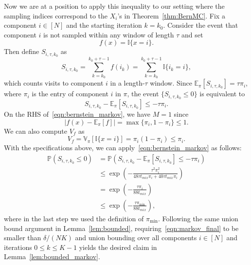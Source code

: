 \documentclass{article}
\theoremstyle{plain}
\theoremstyle{definition}
\newcommand{\E}{\mathbb{E}}
\renewcommand{\P}{\mathbb{P}}
\newcommand{\V}{\mathbb{V}}
\newcommand{\bracket}[1]{\left[ #1\right]}
\newcommand{\paren}[1]{\left( #1\right)}
\begin{document}
Now we are at a position to apply this inequality to our setting where the sampling indices correspond to the $X_i$'s in Theorem~\ref{thm:BernMC}. Fix a component $i\in[N]$ and the starting iteration $k=k_0$. Consider the event that component $i$ is not sampled within any window of length $\tau$ and set
\begin{equation}
    f(x)=\mathbb{I}\{x=i\}.
\end{equation}
Then define $S_{i,\tau,k_0}$ as
\begin{equation}
    S_{i,\tau,k_0}=\sum_{k=k_0}^{k_0+\tau-1}f(i_k)=\sum_{k=k_0}^{k_0+\tau-1}\mathbb{I}\{i_k=i\},
\end{equation}
which counts visits to component $i$ in a length-$\tau$ window. Since $\E_\pi\bracket{S_{i,\tau,k_0}}=\tau\pi_i$, where $\pi_i$ is the entry of component $i$ in $\pi$, the event $\{S_{i,\tau,k_0}\leq0\}$ is equivalent to
\begin{equation}
    S_{i,\tau,k_0}-\E_\pi[S_{i,\tau,k_0}]\leq -\tau \pi_i.
\end{equation}
On the RHS of~\eqref{eqn:bernstein_markov}, we have $M=1$ since
\begin{equation}
    |f(x)-\E_\pi[f]|=\max\{\pi_i, 1-\pi_i\}\leq 1.
\end{equation}
We can also compute $V_f$ as
\begin{equation}
    V_f=\V_\pi\bracket{\mathbb{I}\{x=i\}}=\pi_i(1-\pi_i)\leq \pi_i.
\end{equation}
With the specifications above, we can apply~\eqref{eqn:bernstein_markov} as follows:
\begin{equation}
\begin{aligned}
    \P\paren{S_{i,\tau,k_0}\leq 0} &= \P\paren{S_{i,\tau,k_0}-\E_\pi[S_{i,\tau,k_0}]\leq -\tau \pi_i}\\
    &\leq \exp\paren{-\frac{\tau^2\pi_i^2}{48\tau t_{mix}\pi_i + 40\tau t_{mix} \pi_i}}\\
    &=\exp\paren{-\frac{\tau\pi_i}{88t_{mix}}}\\
    &\leq \exp\paren{-\frac{\tau\pi_{\min}}{88t_{mix}}},\label{eqn:markov_final}
\end{aligned}
\end{equation}
where in the last step we used the definition of $\pi_{\min}$. Following the same union bound argument in Lemma~\ref{lem:bounded}, requiring~\eqref{eqn:markov_final} to be smaller than $\delta/(NK)$ and union bounding over all components $i\in[N]$ and iterations $0\leq k\leq K-1$ yields the desired claim in Lemma~\ref{lem:bounded_markov}.

\end{document}
